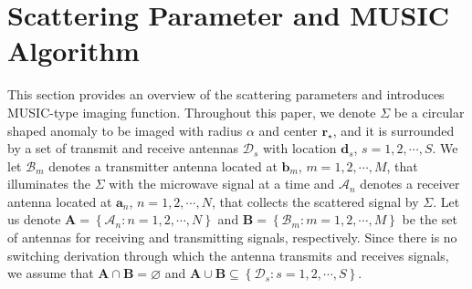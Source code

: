 \documentclass[3p,10pt]{elsarticle}
\newcommand{\set}[1]{\left\{#1\right\}}
\newcommand{\ma}{\mathbf{a}}
\newcommand{\mb}{\mathbf{b}}
\newcommand{\md}{\mathbf{d}}
\newcommand{\mr}{\mathbf{r}}
\newcommand{\mA}{\mathbf{A}}
\newcommand{\mB}{\mathbf{B}}
\theoremstyle{plain}
\theoremstyle{remark}
\begin{document}
\section{Scattering Parameter and MUSIC Algorithm}\label{sec:2}
This section provides an overview of the scattering parameters and introduces MUSIC-type imaging function. Throughout this paper, we denote $\Sigma$ be a circular shaped anomaly to be imaged with radius $\alpha$ and center $\mr_\star$, and it is surrounded by a set of transmit and receive antennas $\mathcal{D}_{s}$ with location $\md_s$, $s=1,2,\cdots,S$. We let $\mathcal{B}_m$ denotes a transmitter antenna located at $\mb_m$, $m=1,2,\cdots,M$, that illuminates the $\Sigma$ with the microwave signal at a time and $\mathcal{A}_n$ denotes a receiver antenna located at $\ma_n$, $n=1,2,\cdots,N$, that collects the scattered signal by $\Sigma$. Let us denote $\mA=\set{\mathcal{A}_n:n=1,2,\cdots,N}$ and $\mB=\set{\mathcal{B}_m:m=1,2,\cdots,M}$ be the set of antennas for receiving and transmitting signals, respectively. Since there is no switching derivation through which the antenna transmits and receives signals, we assume that $\mA\cap\mB=\varnothing$ and $\mA\cup\mB\subseteq\set{\mathcal{D}_s:s=1,2,\cdots,S}$.
\end{document}
